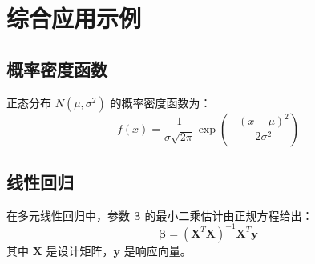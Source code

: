 \documentclass{article}
\begin{document}
\section{综合应用示例}

\subsection{概率密度函数}
正态分布 $N(\mu, \sigma^2)$ 的概率密度函数为：
\[
f(x) = \frac{1}{\sigma\sqrt{2\pi}} \exp\left(-\frac{(x-\mu)^2}{2\sigma^2}\right)
\]

\subsection{线性回归}
在多元线性回归中，参数 $\boldsymbol{\beta}$ 的最小二乘估计由正规方程给出：
\[
\boldsymbol{\beta} = (\mathbf{X}^T\mathbf{X})^{-1}\mathbf{X}^T\mathbf{y}
\]
其中 $\mathbf{X}$ 是设计矩阵，$\mathbf{y}$ 是响应向量。
\end{document}
